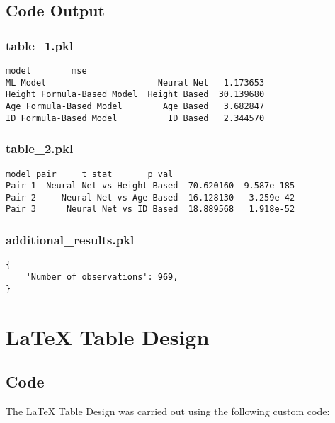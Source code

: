 \documentclass[11pt]{article}
\begin{document}
\subsection{Code Output}

\subsubsection*{table\_1.pkl}

\begin{Verbatim}[tabsize=4]
                                   model        mse
ML Model                      Neural Net   1.173653
Height Formula-Based Model  Height Based  30.139680
Age Formula-Based Model        Age Based   3.682847
ID Formula-Based Model          ID Based   2.344570
\end{Verbatim}

\subsubsection*{table\_2.pkl}

\begin{Verbatim}[tabsize=4]
                        model_pair     t_stat       p_val
Pair 1  Neural Net vs Height Based -70.620160  9.587e-185
Pair 2     Neural Net vs Age Based -16.128130   3.259e-42
Pair 3      Neural Net vs ID Based  18.889568   1.918e-52
\end{Verbatim}

\subsubsection*{additional\_results.pkl}

\begin{Verbatim}[tabsize=4]
{
    'Number of observations': 969,
}
\end{Verbatim}

\section{LaTeX Table Design}
\subsection{{Code}}
The LaTeX Table Design was carried out using the following custom code:
\end{document}
